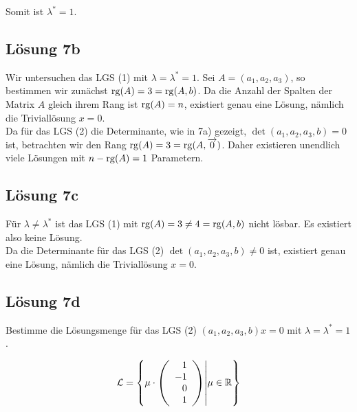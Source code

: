 \documentclass[main.tex]{subfiles}
\begin{document}
Somit ist $\lambda^* = 1$.

\subsection{Lösung 7b}
Wir untersuchen das LGS (1) mit $\lambda = \lambda^* = 1$. Sei $A=(a_1, a_2, a_3)$, so bestimmen wir zunächst $\rg (A) = 3 = \rg (A, b)$. 
Da die Anzahl der Spalten der Matrix $A$ gleich ihrem Rang ist $\rg(A) = n$, existiert genau eine Lösung, nämlich die Triviallösung $x=0$.\\

Da für das LGS (2) die Determinante, wie in 7a) gezeigt, $\det (a_1, a_2, a_3, b) = 0$ ist, betrachten wir den Rang $\rg(A) = 3 = \rg(A, \vec{0})$.
Daher existieren unendlich viele Lösungen mit $n-\rg(A) = 1$ Parametern.

\subsection{Lösung 7c}
Für $\lambda \neq \lambda^*$ ist das LGS (1) mit $\rg (A) = 3 \neq 4 = \rg (A,b)$ nicht lösbar. Es existiert also keine Lösung.\\

Da die Determinante für das LGS (2) $\det (a_1, a_2, a_3, b) \neq 0$ ist, existiert genau eine Lösung, nämlich die Triviallösung $x=0$.

\subsection{Lösung 7d}
Bestimme die Lösungsmenge für das LGS (2) $(a_1, a_2, a_3, b) x = 0$ mit $\lambda = \lambda^* = 1$.



$$
    \mathcal{L} = \left\{ \mu \cdot \eqmatrix{r}{1 \\ -1 \\ 0 \\ 1} \middle| \mu \in \mathbb{R} \right\}
$$
\end{document}
